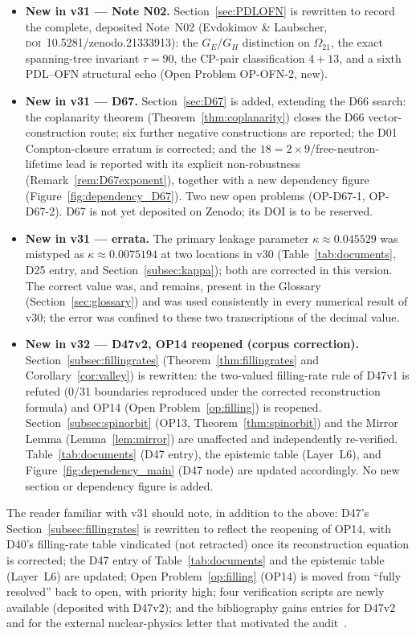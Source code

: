 \documentclass[11pt,a4paper]{article}
\theoremstyle{plain}
\theoremstyle{definition}
\theoremstyle{remark}
\begin{document}
\begin{itemize}
\item \textbf{New in v31 --- Note N02.} Section~\ref{sec:PDLOFN} is rewritten to record the complete, deposited Note~N02 (Evdokimov \& Laubscher, \textsc{doi}~10.5281/zenodo.21333913): the $G_E$/$G_H$ distinction on $\Omega_{21}$, the exact spanning-tree invariant $\tau=90$, the CP-pair classification $4+13$, and a sixth PDL--OFN structural echo (Open Problem OP-OFN-2, new).
\item \textbf{New in v31 --- D67.} Section~\ref{sec:D67} is added, extending the D66 search: the coplanarity theorem (Theorem~\ref{thm:coplanarity}) closes the D66 vector-construction route; six further negative constructions are reported; the D01 Compton-closure erratum is corrected; and the $18=2\times9$/free-neutron-lifetime lead is reported with its explicit non-robustness (Remark~\ref{rem:D67exponent}), together with a new dependency figure (Figure~\ref{fig:dependency_D67}). Two new open problems (OP-D67-1, OP-D67-2). D67 is not yet deposited on Zenodo; its DOI is to be reserved.
\item \textbf{New in v31 --- errata.} The primary leakage parameter $\kappa\approx0.045529$ was mistyped as $\kappa\approx0.0075194$ at two locations in v30 (Table~\ref{tab:documents}, D25 entry, and Section~\ref{subsec:kappa}); both are corrected in this version. The correct value was, and remains, present in the Glossary (Section~\ref{sec:glossary}) and was used consistently in every numerical result of v30; the error was confined to these two transcriptions of the decimal value.
\item \textbf{New in v32 --- D47v2, OP14 reopened (corpus correction).} Section~\ref{subsec:fillingrates} (Theorem~\ref{thm:fillingrates} and Corollary~\ref{cor:valley}) is rewritten: the two-valued filling-rate rule of D47v1 is refuted (0/31 boundaries reproduced under the corrected reconstruction formula) and OP14 (Open Problem~\ref{op:filling}) is reopened. Section~\ref{subsec:spinorbit} (OP13, Theorem~\ref{thm:spinorbit}) and the Mirror Lemma (Lemma~\ref{lem:mirror}) are unaffected and independently re-verified. Table~\ref{tab:documents} (D47 entry), the epistemic table (Layer~L6), and Figure~\ref{fig:dependency_main} (D47 node) are updated accordingly. No new section or dependency figure is added.
\end{itemize}

The reader familiar with v31 should note, in addition to the above: D47's Section~\ref{subsec:fillingrates} is rewritten to reflect the reopening of OP14, with D40's filling-rate table vindicated (not retracted) once its reconstruction equation is corrected; the D47 entry of Table~\ref{tab:documents} and the epistemic table (Layer~L6) are updated; Open Problem~\ref{op:filling} (OP14) is moved from ``fully resolved'' back to open, with priority high; four verification scripts are newly available (deposited with D47v2); and the bibliography gains entries for D47v2 and for the external nuclear-physics letter that motivated the audit~\cite{Pigliapoco2026}.
\end{document}
